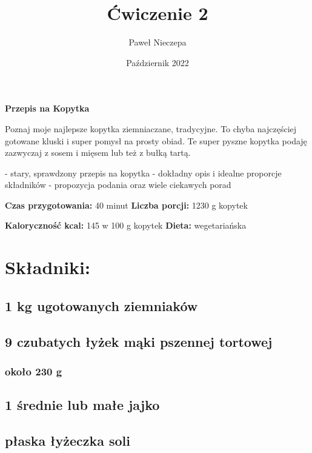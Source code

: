 \documentclass[12pt, letterpaper, titlepage]{article}
\title{Ćwiczenie 2}
\author{Paweł Nieczepa}
\date{Październik 2022}
\begin{document}
\maketitle

\begin{center}
\Huge 
\textbf{Przepis na Kopytka}
\end{center}

\Large
Poznaj moje najlepsze kopytka ziemniaczane, tradycyjne. To chyba najczęściej gotowane kluski i super pomysł na prosty obiad. Te super pyszne kopytka podaję zazwyczaj z sosem i mięsem lub też z bułką tartą.\newline

\noindent - stary, sprawdzony przepis na kopytka \newline
- dokładny opis i idealne proporcje składników \newline
- propozycja podania oraz wiele ciekawych porad \newline
\normalsize

\noindent\textbf {Czas przygotowania:} 40 minut \newline
\textbf {Liczba porcji:} 1230 g kopytek \newline

\noindent\textbf {Kaloryczność kcal:} 145 w 100 g kopytek \newline
\textbf {Dieta:} wegetariańska \newline

\section{Składniki:}
\subsection{1 kg ugotowanych ziemniaków}
\subsection{9 czubatych łyżek mąki pszennej tortowej}
\subsubsection{około 230 g}
\subsection{1 średnie lub małe jajko}
\subsection{płaska łyżeczka soli}
\end{document}
